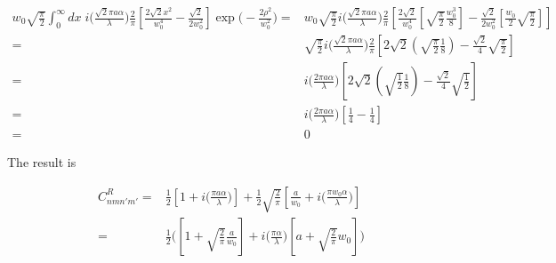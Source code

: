 \documentclass[aps,twoside,secnumarabic,balancelastpage,amsmath,amssymb,nofootinbib,hyperref=pdftex]{revtex4}
\begin{document}
\begin{align*}
w_0 \sqrt{ \frac{\pi}{2} }   \int_{0}^{\infty} dx \;
            			i  
				\big( \frac{\sqrt{2} \pi a \alpha}{ \lambda} \big)
                \frac{2}{\pi}
                \left[
                    \frac{2 \sqrt{2} x^2}{w_0^4}
                    -
                    \frac{\sqrt{2}}{2 w_0^2}
                \right]
                \exp \big( - \frac{2 \rho^2}{w_0^2} \big)
                =&
    w_0 \sqrt{ \frac{\pi}{2} }
            			i  
				\big( \frac{\sqrt{2} \pi a \alpha}{ \lambda} \big)
                \frac{2}{\pi}
                \left[
                    \frac{2 \sqrt{2}}{w_0^4}
                	\left[
                        \sqrt{ \frac{\pi}{2}}
                        \frac{w_0^3}{8}
                    \right]
                   -
                    \frac{\sqrt{2}}{2 w_0^2}
                    	\left[
                    	\frac{w_0}{2}
                     	\sqrt{ \frac{\pi}{2}}
                     	\right]
                \right]
      \\=&
                    \sqrt{ \frac{\pi}{2} }
            			i  
				\big( \frac{\sqrt{2} \pi a \alpha}{ \lambda} \big)
                \frac{2}{\pi}
                \left[
                    {2 \sqrt{2}}
                    (
                        \sqrt{ \frac{\pi}{2}}
                        \frac{1}{8}
                    )
                    -
                    \frac{\sqrt{2}}{4 }
                  \sqrt{ \frac{\pi}{2}}
                \right]
      \\=&
            			i  
				\big( \frac{2 \pi a \alpha}{ \lambda} \big)
                \left[
                    {2 \sqrt{2}}
                    (
                        \sqrt{ \frac{1}{2}}
                        \frac{1}{8}
                    )
                    -
                    \frac{\sqrt{2}}{4 }
                  \sqrt{ \frac{1}{2}}
                \right]
      \\=&
            			i  
				\big( \frac{2 \pi a \alpha}{ \lambda} \big)
                \left[
                        \frac{1}{4}
                    -
                    \frac{1}{4}
                \right]
                      \\=&
            			0
\end{align*}

The result is

\begin{align*}
C_{nmn'm'}^{R} =  &
	         { \frac{1}{2} }
        \left[
				1+
				i \big( \frac{ \pi a \alpha}{ \lambda} \big)
			\right] 
			+
			\frac{1}{2}
       \sqrt{ \frac{2}{\pi} } 
        	\left[
                \frac{a}{w_{0}}		
                +
                i  \big( \frac{\pi w_{0} \alpha}{\lambda} \big)
			\right] 		
		\\ = &
		\frac{1}{2}	
		\Big(	         
        \left[
				1
				+
				  \sqrt{\frac{2}{\pi}} \frac{a}{w_0}
		\right] 
	+
		i \big( \frac{ \pi \alpha}{\lambda} \big)	
		\left[
			a
			+
        	        	\sqrt{\frac{2}{\pi}}
        	w_0
		\right] 
		\Big)	
\end{align*}
\end{document}
